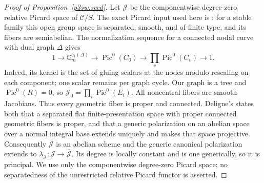 \documentclass[11pt]{article}
\numberwithin{equation}{section}
\begin{document}
\begin{proof}[Proof of Proposition~\ref{p3sw:seed}]
Let \(\mathcal J\) be the componentwise degree-zero relative Picard
space of \(\mathcal C/S\).  The exact Picard input used here is
\cite[Section 2, p.~136]{P3SWDeligneGabber}: for a stable family this
open group space is separated, smooth, and of finite type, and its
fibers are semiabelian.  The normalization sequence for a connected
nodal curve with dual graph \(\Delta\) gives
\begin{equation}
 1\longrightarrow\mathbb G_m^{b_1(\Delta)}
 \longrightarrow\operatorname{Pic}^0(C_0)
 \longrightarrow\prod_v\operatorname{Pic}^0(C_v)
 \longrightarrow1.
 \label{p3sw:support-normalization-picard}
\end{equation}
Indeed, its kernel is the set of gluing scalars at the nodes modulo
rescaling on each component; one scalar remains per graph cycle.
Our graph is a tree and \(\operatorname{Pic}^0(R)=0\), so
\(\mathcal J_0=\prod_i\operatorname{Pic}^0(E_i)\).  All noncentral
fibers are smooth Jacobians.  Thus every geometric fiber is proper
and connected.  Deligne's
\cite[Section 1.1, pp.~131--132]{P3SWDeligneGabber} states both that a
separated flat finite-presentation space with proper connected
geometric fibers is proper, and that a generic polarization on an
abelian space over a normal integral base extends uniquely and makes
that space projective.  Consequently \(\mathcal J\) is an abelian
scheme and the generic canonical polarization extends to
\(\lambda_{\mathcal J}:\mathcal J\to\widehat{\mathcal J}\).
Its degree is locally constant and is one generically, so it is
principal.  We use only the componentwise degree-zero Picard space;
no separatedness of the unrestricted relative Picard functor is
asserted.


\end{proof}
\end{document}
